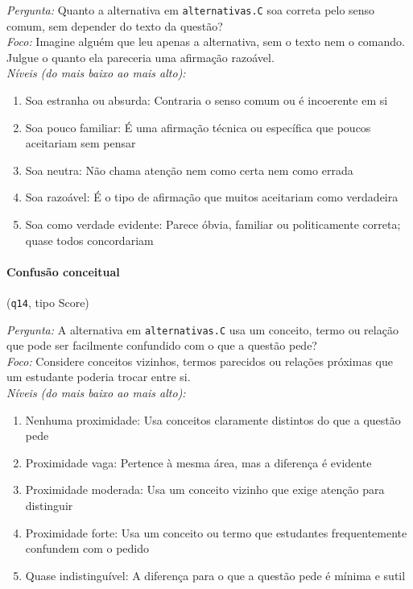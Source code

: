 \textit{Pergunta:} Quanto a alternativa em \texttt{alternativas.C} soa correta pelo senso comum, sem depender do texto da questão?\\
\textit{Foco:} Imagine alguém que leu apenas a alternativa, sem o texto nem o comando. Julgue o quanto ela pareceria uma afirmação razoável.\\
\textit{Níveis (do mais baixo ao mais alto):}
\begin{enumerate}[nosep,label=\arabic*.,start=0]
  \item Soa estranha ou absurda: Contraria o senso comum ou é incoerente em si
  \item Soa pouco familiar: É uma afirmação técnica ou específica que poucos aceitariam sem pensar
  \item Soa neutra: Não chama atenção nem como certa nem como errada
  \item Soa razoável: É o tipo de afirmação que muitos aceitariam como verdadeira
  \item Soa como verdade evidente: Parece óbvia, familiar ou politicamente correta; quase todos concordariam
\end{enumerate}

\paragraph{Confusão conceitual} (\texttt{q14}, tipo Score)

\textit{Pergunta:} A alternativa em \texttt{alternativas.C} usa um conceito, termo ou relação que pode ser facilmente confundido com o que a questão pede?\\
\textit{Foco:} Considere conceitos vizinhos, termos parecidos ou relações próximas que um estudante poderia trocar entre si.\\
\textit{Níveis (do mais baixo ao mais alto):}
\begin{enumerate}[nosep,label=\arabic*.,start=0]
  \item Nenhuma proximidade: Usa conceitos claramente distintos do que a questão pede
  \item Proximidade vaga: Pertence à mesma área, mas a diferença é evidente
  \item Proximidade moderada: Usa um conceito vizinho que exige atenção para distinguir
  \item Proximidade forte: Usa um conceito ou termo que estudantes frequentemente confundem com o pedido
  \item Quase indistinguível: A diferença para o que a questão pede é mínima e sutil
\end{enumerate}

